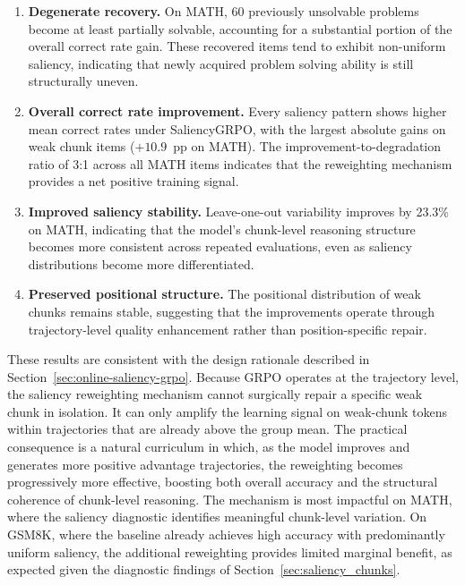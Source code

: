 \documentclass[12pt]{report}
\begin{document}
\begin{enumerate}
\item \textbf{Degenerate recovery.} 
On MATH, 60 previously unsolvable problems become at least partially solvable, accounting for a substantial portion of the overall correct rate gain.
These recovered items tend to exhibit non-uniform saliency, indicating that newly acquired problem solving ability is still structurally uneven.

\item \textbf{Overall correct rate improvement.}
Every saliency pattern shows higher mean correct rates under SaliencyGRPO, with the largest absolute gains on weak chunk items ($+10.9$~pp on MATH).  
The improvement-to-degradation ratio of 3:1 across all MATH items
indicates that the reweighting mechanism provides a net positive training signal.

\item \textbf{Improved saliency stability.}  
Leave-one-out variability improves by 23.3\% on MATH,
indicating that the model's chunk-level reasoning structure becomes more consistent across repeated evaluations, 
even as saliency distributions become more differentiated.

\item \textbf{Preserved positional structure.}
The positional distribution of weak chunks remains stable, suggesting that the improvements operate through trajectory-level quality enhancement
rather than position-specific repair.
\end{enumerate}

These results are consistent with the design rationale described in Section~\ref{sec:online-saliency-grpo}. 
Because GRPO operates at the trajectory level, the saliency reweighting mechanism cannot surgically repair a specific weak chunk in isolation. It can only amplify the learning signal on weak-chunk tokens within trajectories that are already above the group mean.
The practical consequence is a natural curriculum in which, as the model improves and generates more positive advantage trajectories, the reweighting becomes progressively more effective, boosting both overall accuracy and the structural coherence of chunk-level reasoning.
The mechanism is most impactful on MATH, where the saliency diagnostic identifies meaningful chunk-level variation.
On GSM8K, where the baseline already achieves high accuracy with predominantly uniform
saliency, the additional reweighting provides limited marginal benefit, as expected given the diagnostic findings of Section~\ref{sec:saliency_chunks}.
\end{document}

